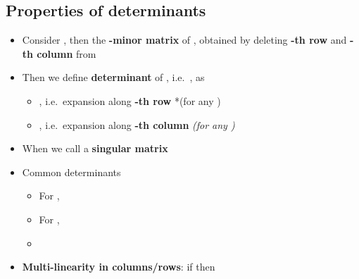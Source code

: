\subsection*{Properties of
  determinants}

\begin{itemize}

  \item
        Consider , then
         the
        \textbf{-minor matrix} of , obtained by deleting
        \textbf{-th row} and \textbf{-th column} from
  \item
        Then we define \textbf{determinant} of ,
        i.e.~, as

        \begin{itemize}

          \item
                ,
                i.e.~expansion along \textbf{-th row} *(for any )
          \item
                ,
                i.e.~expansion along \textbf{-th column} \emph{(for any
                  )}
        \end{itemize}
  \item
        When  we call  a \textbf{singular matrix}
  \item
        Common determinants

        \begin{itemize}

          \item
                For , 
          \item
                For , 
          \item
        \end{itemize}
  \item
        \textbf{Multi-linearity in columns/rows}: if
        then


\end{itemize}
